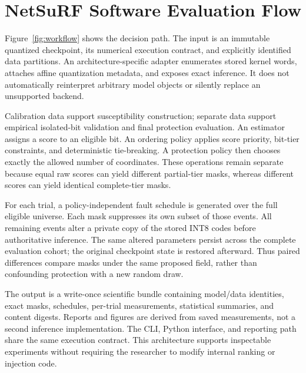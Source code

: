 \section{NetSuRF Software Evaluation Flow}
\label{sec:workflow}
Figure~\ref{fig:workflow} shows the decision path. The input is an immutable quantized checkpoint, its numerical execution contract, and explicitly identified data partitions. An architecture-specific adapter enumerates stored kernel words, attaches affine quantization metadata, and exposes exact inference. It does not automatically reinterpret arbitrary model objects or silently replace an unsupported backend.

Calibration data support susceptibility construction; separate data support empirical isolated-bit validation and final protection evaluation. An estimator assigns a score to an eligible bit. An ordering policy applies score priority, bit-tier constraints, and deterministic tie-breaking. A protection policy then chooses exactly the allowed number of coordinates. These operations remain separate because equal raw scores can yield different partial-tier masks, whereas different scores can yield identical complete-tier masks.

For each trial, a policy-independent fault schedule is generated over the full eligible universe. Each mask suppresses its own subset of those events. All remaining events alter a private copy of the stored INT8 codes before authoritative inference. The same altered parameters persist across the complete evaluation cohort; the original checkpoint state is restored afterward. Thus paired differences compare masks under the same proposed field, rather than confounding protection with a new random draw.

The output is a write-once scientific bundle containing model/data identities, exact masks, schedules, per-trial measurements, statistical summaries, and content digests. Reports and figures are derived from saved measurements, not a second inference implementation. The CLI, Python interface, and reporting path share the same execution contract. This architecture supports inspectable experiments without requiring the researcher to modify internal ranking or injection code.

